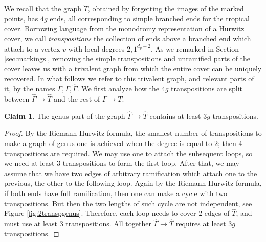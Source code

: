 \documentclass[11pt,reqno]{amsart}
\theoremstyle{definition}
\newtheorem{claim}[theorem]{Claim}
\newcommand{\gGamma}{\widehat{\Gamma}}
\newcommand{\gT}{\widehat{T}}
\begin{document}
We recall that the  graph $\widetilde{T}$, obtained by forgetting the images of the marked points, has $4g$ ends, all corresponding to simple branched ends for the tropical cover. Borrowing language from the monodromy representation of a Hurwitz cover, we call {\it transpositions} the collection of ends above a branched end which attach to a vertex $v$ with local degrees $2, 1^{d_v-2}$. As we remarked in Section \ref{sec:markings}, removing the simple transpositions and unramified parts of the cover leaves us with a trivalent graph from which the entire cover can be uniquely recovered. In what follows we refer to this trivalent graph, and relevant parts of it, by the names $\Gamma, \widetilde{\Gamma}, \gGamma$. We first analyze how the $4g$ transpositions are split between $\gGamma \to \gT$ and the rest of $\Gamma \to T$. 
\begin{claim}
    The genus part of the graph $\gGamma \to \gT$ contains at least $3g$ transpositions.
\end{claim}

\begin{proof}
    By the Riemann-Hurwitz formula, the smallest number of transpositions to make a graph of genus one is achieved when the degree is equal to $2$; then $4$ transpositions are required. We may use one to attach the subsequent loops,  so we need at least $3$ transpositions to form the first loop.
    After that, we may assume that we have two edges of arbitrary ramification which attach one to the previous, the other to the following loop. Again by the Riemann-Hurwitz formula, if both ends have full ramification, then one can make a cycle with two transpositions. But then the two lengths of such cycle are not independent, see Figure \ref{fig:2transpgenus}.
    Therefore, each loop needs to cover 2 edges of $\gT$, and must use at least 3 transpositions. All together $\gGamma \to \gT$ requires at least $3g$ transpositions. 
\end{proof}
\end{document}
